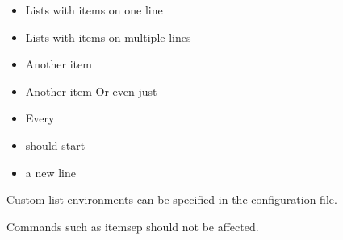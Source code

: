 \documentclass{article}
\begin{document}
\begin{itemize}

\item Lists with items on one line

\item Lists with items
on multiple lines

\item Another item

\item Another item
Or even just %

\item Every \item should start \item a new line

\end{itemize}

\begin{myitemize}

\item Custom list environments can be specified in the configuration file.

\end{myitemize}

Commands such as itemsep should not be affected.
\setlength{\itemsep}{0pt}
\end{document}
